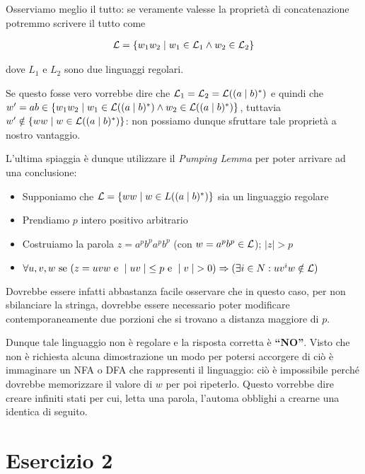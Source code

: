 \documentclass[class=book, crop=false, oneside, 12pt]{standalone}
\begin{document}
Osserviamo meglio il tutto: se veramente valesse la proprietà di concatenazione potremmo scrivere il tutto come 

\begin{align*}
    \mathcal{L} = \{w_1 w_2 \mid w_1 \in \mathcal{L}_1 \land w_2 \in \mathcal{L}_2\}
\end{align*}

dove \(L_1\) e \(L_2\) sono due linguaggi regolari. 

Se questo fosse vero vorrebbe dire che \(\mathcal{L}_1 = \mathcal{L}_2 = \mathcal{L}((a \mid b)^*)\) e quindi che \(w' = ab \in \{w_1 w_2 \mid w_1 \in \mathcal{L}((a \mid b)^*) \land w_2 \in \mathcal{L}((a \mid b)^*)\}\), tuttavia \(w' \notin \{ww \mid w \in \mathcal{L}((a \mid b)^*)\}\): non possiamo dunque sfruttare tale proprietà a nostro vantaggio.

L'ultima spiaggia è dunque utilizzare il \emph{Pumping Lemma} per poter arrivare ad una conclusione:

\begin{itemize}
    \item Supponiamo che \(\mathcal{L} = \{ww \mid w \in L((a \mid b)^*)\}\) sia un linguaggio regolare
    \item Prendiamo \(p\) intero positivo arbitrario 
    \item Costruiamo la parola \(z = a^pb^pa^pb^p\) (con \(w = a^pb^p \in \mathcal{L}\)); \(\mid z \mid > p\)
    \item \(\forall u, v, w \textrm{ se } (z = uvw \textrm{ e } \mid uv \mid \; \leq p \textrm{ e } \mid v \mid \; > 0) \Rightarrow (\exists i \in N : uv^iw \notin \mathcal{L})\)
\end{itemize}

Dovrebbe essere infatti abbastanza facile osservare che in questo caso, per non sbilanciare la stringa, dovrebbe essere necessario poter modificare contemporaneamente due porzioni che si trovano a distanza maggiore di \(p\). 

Dunque tale linguaggio non è regolare e la risposta corretta è \textbf{“NO”}. Visto che non è richiesta alcuna dimostrazione un modo per potersi accorgere di ciò è immaginare un NFA o DFA che rappresenti il linguaggio: ciò è impossibile perché dovrebbe memorizzare il valore di \(w\) per poi ripeterlo. Questo vorrebbe dire creare infiniti stati per cui, letta una parola, l'automa obblighi a crearne una identica di seguito. 

\section*{Esercizio 2}
\end{document}
